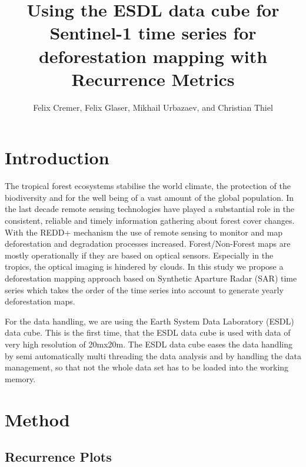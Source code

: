 \documentclass{article}
\title{Using the ESDL data cube for Sentinel-1 time series for deforestation mapping with Recurrence Metrics}
\author{Felix Cremer, Felix Glaser, Mikhail Urbazaev, and Christian Thiel}
\begin{document}
\maketitle

\section{Introduction}
The tropical forest ecosystems stabilise the world climate,
the protection of the biodiversity and
for the well being of a vast amount of the global population.
In the last decade remote sensing technologies have
played a substantial role in the consistent,
reliable and timely information gathering about forest cover changes.
With the REDD+ mechanism the use of remote sensing to monitor
and map deforestation and degradation processes increased.
Forest/Non-Forest maps are mostly operationally
if they are based on optical sensors. Especially in the tropics,
the optical imaging is hindered by clouds.
In this study we  propose a deforestation mapping approach based on Synthetic Aparture Radar (SAR) time
series which takes the order of the time series into account to generate yearly deforestation maps.

For the data handling, we are using the Earth System Data Laboratory (ESDL) data cube. 
This is the first time, that the ESDL data cube is used with data of very high resolution of 20mx20m.
The ESDL data cube eases the data handling by semi automatically multi threading the data analysis and by handling the data management, 
so that not the whole data set has to be loaded into the working memory. 

\section{Method}

\subsection{Recurrence Plots}
\end{document}
